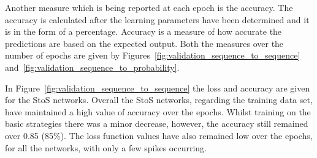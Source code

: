 Another measure which is being reported at each epoch is the accuracy. The accuracy
is calculated after the learning parameters have been determined and it is in
the form of a percentage. Accuracy is a measure of how accurate the predictions
are based on the expected output. Both the measures over the number of epochs
are given by Figures~\ref{fig:validation_sequence_to_sequence}
and~\ref{fig:validation_sequence_to_probability}.

In Figure~\ref{fig:validation_sequence_to_sequence} the loss and accuracy are
given for the StoS networks. Overall the StoS networks, regarding the training
data set, have maintained a high value of accuracy over the epochs. Whilst
training on the basic strategies there was a minor decrease, however, the
accuracy still remained over 0.85 (85\%). The loss function values have also
remained low over the epochs, for all the networks, with only a few spikes
occurring.

